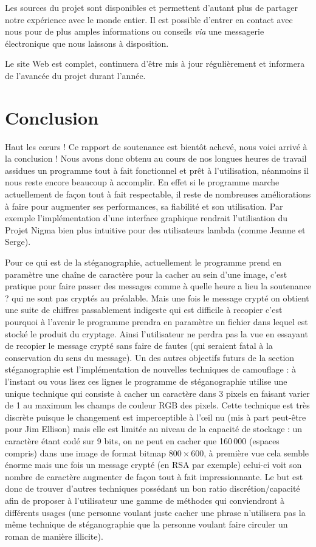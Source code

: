 \documentclass[a4paper,12pt]{article}
\begin{document}
Les sources du projet sont disponibles et permettent d'autant plus de partager notre expérience avec le monde entier. Il est possible d'entrer en contact avec nous pour de plus amples informations ou conseils \emph{via} une messagerie électronique que nous laissons à disposition.

Le site Web est complet, continuera d'être mis à jour régulièrement et informera de l'avancée du projet durant l'année.

\newpage

\section{Conclusion}

Haut les c\oe{}urs ! Ce rapport de soutenance est bientôt achevé, nous voici arrivé à la conclusion ! Nous avons donc obtenu au cours de nos longues heures de travail assidues un programme tout à fait fonctionnel et prêt à l'utilisation, néanmoins il nous reste encore beaucoup à accomplir. En effet si le programme marche actuellement de façon tout à fait respectable, il reste de nombreuses améliorations à faire pour augmenter ses performances, sa fiabilité et son utilisation. Par exemple l'implémentation d'une interface graphique rendrait l'utilisation du Projet Nigma bien plus intuitive pour des utilisateurs lambda (comme Jeanne et Serge).

Pour ce qui est de la stéganographie, actuellement le programme prend en paramètre une chaîne de caractère pour la cacher au sein d'une image, c'est pratique pour faire passer des messages comme \og à quelle heure a lieu la soutenance ? \fg{} qui ne sont pas cryptés au préalable. Mais une fois le message crypté on obtient une suite de chiffres passablement indigeste qui est difficile à recopier c'est pourquoi à l'avenir le programme prendra en paramètre un fichier dans lequel est stocké le produit du cryptage. Ainsi l'utilisateur ne perdra pas la vue en essayant de recopier le message crypté sans faire de fautes (qui seraient fatal à la conservation du sens du message). Un des autres objectifs futurs de la section stéganographie est l'implémentation de nouvelles techniques de camouflage : à l'instant ou vous lisez ces lignes le programme de stéganographie utilise une unique technique qui consiste à cacher un caractère dans 3 pixels en faisant varier de 1 au maximum les champs de couleur RGB des pixels. Cette technique est très discrète puisque le changement est imperceptible à l'\oe{}il nu (mis à part peut-être pour Jim Ellison) mais elle est limitée au niveau de la capacité de stockage : un caractère étant codé sur 9 bits, on ne peut en cacher que 160\,000 (espaces compris) dans une image de format bitmap $800 \times 600$, à première vue cela semble énorme mais une fois un message crypté (en RSA par exemple) celui-ci voit son nombre de caractère augmenter de façon tout à fait impressionnante. Le but est donc de trouver d'autres techniques possédant un bon ratio discrétion/capacité afin de proposer à l'utilisateur une gamme de méthodes qui conviendront à différents usages (une personne voulant juste cacher une phrase n'utilisera pas la même technique de stéganographie que la personne voulant faire circuler un roman de manière illicite).
\end{document}
